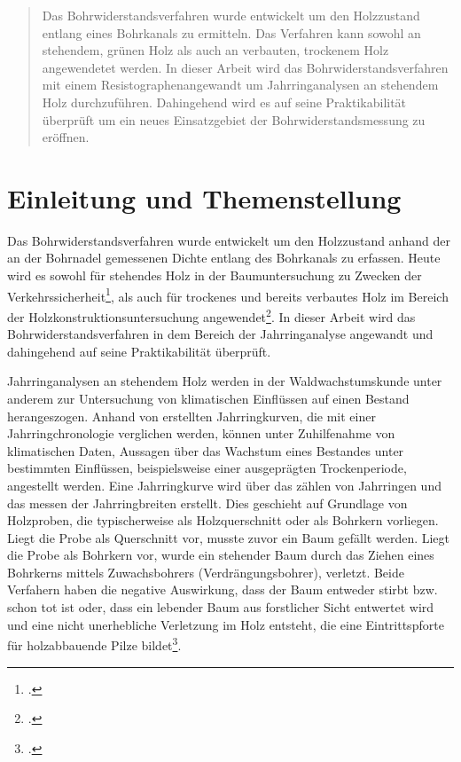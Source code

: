 \documentclass[a4paper, halfparskip]{article}
\def\SymbReg{\textsuperscript{\textregistered}}
\begin{document}
\tableofcontents
\thispagestyle{empty}
\pagebreak

\begin{abstract}
Das Bohrwiderstandsverfahren wurde entwickelt um den Holzzustand entlang eines
Bohrkanals zu ermitteln. Das Verfahren kann sowohl an stehendem, grünen Holz als
auch an verbauten, trockenem Holz angewendetet werden. 
In dieser Arbeit wird das Bohrwiderstandsverfahren mit einem
Resistographen\SymbReg angewandt um Jahrringanalysen an stehendem Holz
durchzuführen. Dahingehend wird es auf seine Praktikabilität überprüft um 
ein neues Einsatzgebiet der Bohrwiderstandsmessung zu eröffnen.
\end{abstract}

\listoffigures

\listoftables

\section{Einleitung und Themenstellung}\label{sec:einleitung}
Das Bohrwiderstandsverfahren wurde entwickelt um den Holzzustand
anhand der an der Bohrnadel gemessenen Dichte entlang des Bohrkanals zu
erfassen. Heute wird es sowohl für stehendes Holz in der Baumuntersuchung zu
Zwecken der Verkehrssicherheit\footcite{rinn:bohrwiderstandsprofile}, als auch
für trockenes und bereits verbautes Holz im Bereich der
Holzkonstruktionsuntersuchung
angewendet\footcite{rinnfischer:zustandskartierung}. In dieser Arbeit wird das
Bohrwiderstandsverfahren in dem Bereich der Jahrringanalyse angewandt und
dahingehend auf seine Praktikabilität überprüft.

Jahrringanalysen an stehendem Holz werden in der Waldwachstumskunde unter
anderem zur Untersuchung von klimatischen Einflüssen auf einen Bestand
herangeszogen. Anhand von erstellten Jahrringkurven, die mit einer
Jahrringchronologie verglichen werden, können unter Zuhilfenahme von
klimatischen Daten, Aussagen über das Wachstum eines Bestandes unter
bestimmten Einflüssen, beispielsweise einer ausgeprägten Trockenperiode,
angestellt werden. Eine Jahrringkurve wird über das zählen von Jahrringen und
das messen der Jahrringbreiten erstellt. Dies geschieht auf Grundlage von
Holzproben, die typischerweise als Holzquerschnitt oder als Bohrkern
vorliegen. Liegt die Probe als Querschnitt vor, musste zuvor ein Baum gefällt
werden. Liegt die Probe als Bohrkern vor, wurde ein stehender Baum durch
das Ziehen eines Bohrkerns mittels Zuwachsbohrers (Verdrängungsbohrer),
verletzt. Beide Verfahern haben die negative Auswirkung, dass der Baum
entweder stirbt bzw. schon tot ist oder, dass ein lebender Baum aus
forstlicher Sicht entwertet wird und eine nicht unerhebliche Verletzung
im Holz entsteht, die eine Eintrittspforte für holzabbauende Pilze
bildet\footcite[66]{schweingruber1983jahrring}.
\end{document}

